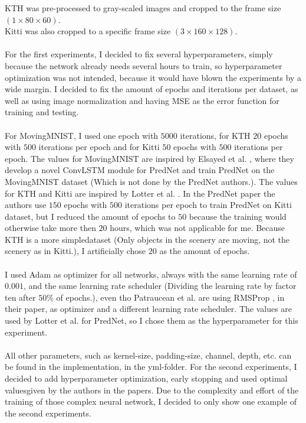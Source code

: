   KTH was pre-processed to gray-scaled images and cropped to the frame size $(1 \times 80 \times 60)$.\\
  Kitti was also cropped to a specific frame size $(3 \times 160 \times 128)$.
  \\\\
  For the first experiments, I decided to fix several hyperparameters, simply because the network already needs several hours to train, so hyperparameter 
  optimization was not intended, because it would have blown the experiments by a wide margin.
  I decided to fix the amount of epochs and iterations per dataset, as well as using image normalization and having MSE as the
  error function for training and testing.
  \\\\
  For MovingMNIST, I used one epoch with $5000$ iterations, for KTH $20$ epochs with $500$ iterations per epoch and for Kitti $50$ epochs with $500$ iterations
  per epoch. The values for MovingMNIST are inspired by Elsayed et al. \cite{Elsayed2018}, where they develop a novel ConvLSTM module for PredNet and train
  PredNet on the MovingMNIST dataset (Which is not done by the PredNet authors.). The values for KTH and Kitti are inspired by Lotter et al. \cite{Lotter2016}.
  In the PredNet paper the authors use $150$ epochs with $500$ iterations per epoch to train PredNet on Kitti dataset, but I reduced the amount of epochs to
  $50$ because the training would otherwise take more then $20$ hours, which was not applicable for me. Because KTH is a more \glqq simple\grqq dataset (Only 
  objects in the scenery are moving, not the scenery as in Kitti.), I artificially chose $20$ as the amount of epochs.\\\\
  I used Adam \cite{Kingma2015} as optimizer for all networks, always with the same learning rate of $0.001$, and the same learning rate scheduler (Dividing the 
  learning rate by factor ten after $50$\% of epochs.), even tho 
  Patraucean et al. \cite{Patraucean2015} are using RMSProp \cite{Ruder2016}, in their paper, as optimizer and a different learning rate scheduler.
  The values are used by Lotter et al. \cite{Lotter2016} for PredNet, so I chose them as the hyperparameter for this experiment.
  \\\\
  All other parameters, such as kernel-size, padding-size, channel, depth, etc. can be found in the implementation, in the yml-folder.  
  For the second experiments, I decided to add hyperparameter optimization, early stopping and used \glqq optimal values\grqq given by the authors in the papers.
  Due to the complexity and effort of the training of those complex neural network, I decided to only show one example of the second experiments.
  
